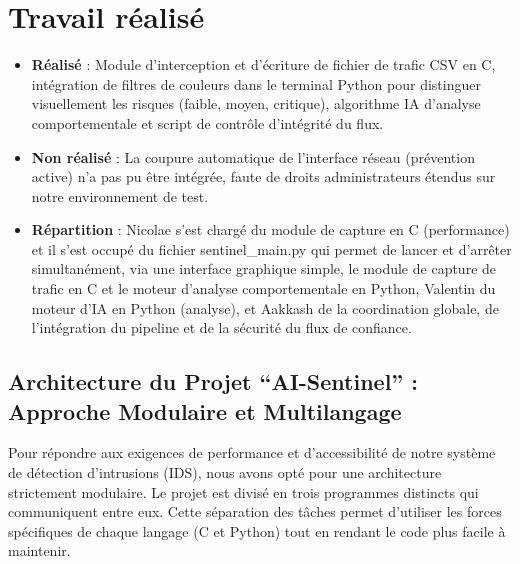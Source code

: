 \documentclass[a4paper, 12pt, twoside]{article}
\begin{document}
\section{Travail réalisé}
\begin{itemize}
    \item \textbf{Réalisé} : Module d'interception et d'écriture de fichier de trafic CSV en C, intégration de filtres de couleurs dans le terminal Python pour distinguer visuellement les risques (faible, moyen, critique), algorithme IA d'analyse comportementale et script de contrôle d'intégrité du flux.
    \item \textbf{Non réalisé} : La coupure automatique de l'interface réseau (prévention active) n'a pas pu être intégrée, faute de droits administrateurs étendus sur notre environnement de test.
    \item \textbf{Répartition} : Nicolae s'est chargé du module de capture en C (performance) et il s'est occupé du fichier sentinel\_main.py qui permet de lancer et d'arrêter simultanément, via une interface graphique simple, le module de capture de trafic en C et le moteur d'analyse comportementale en Python, Valentin du moteur d'IA en Python (analyse), et Aakkash de la coordination globale, de l'intégration du pipeline et de la sécurité du flux de confiance.
\end{itemize}
\subsection{Architecture du Projet ``AI-Sentinel'' : Approche Modulaire et Multilangage}
Pour répondre aux exigences de performance et d'accessibilité de notre système de détection d'intrusions (IDS), nous avons opté pour une architecture strictement modulaire. Le projet est divisé en trois programmes distincts qui communiquent entre eux. Cette séparation des tâches permet d'utiliser les forces spécifiques de chaque langage (C et Python) tout en rendant le code plus facile à maintenir.
\end{document}
